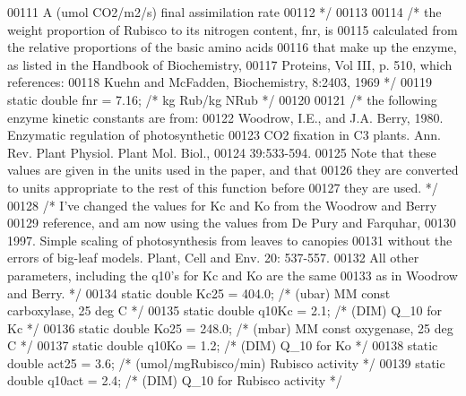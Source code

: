 \begin{DoxyCode}
00111 \textcolor{comment}{    A          (umol CO2/m2/s) final assimilation rate}
00112 \textcolor{comment}{    */}
00113     
00114     \textcolor{comment}{/* the weight proportion of Rubisco to its nitrogen content, fnr, is }
00115 \textcolor{comment}{    calculated from the relative proportions of the basic amino acids }
00116 \textcolor{comment}{    that make up the enzyme, as listed in the Handbook of Biochemistry, }
00117 \textcolor{comment}{    Proteins, Vol III, p. 510, which references:}
00118 \textcolor{comment}{    Kuehn and McFadden, Biochemistry, 8:2403, 1969 */}
00119     \textcolor{keyword}{static} \textcolor{keywordtype}{double} fnr = 7.16;   \textcolor{comment}{/* kg Rub/kg NRub */}
00120     
00121     \textcolor{comment}{/* the following enzyme kinetic constants are from: }
00122 \textcolor{comment}{    Woodrow, I.E., and J.A. Berry, 1980. Enzymatic regulation of photosynthetic}
00123 \textcolor{comment}{    CO2 fixation in C3 plants. Ann. Rev. Plant Physiol. Plant Mol. Biol.,}
00124 \textcolor{comment}{    39:533-594.}
00125 \textcolor{comment}{    Note that these values are given in the units used in the paper, and that}
00126 \textcolor{comment}{    they are converted to units appropriate to the rest of this function before}
00127 \textcolor{comment}{    they are used. */}
00128     \textcolor{comment}{/* I've changed the values for Kc and Ko from the Woodrow and Berry}
00129 \textcolor{comment}{    reference, and am now using the values from De Pury and Farquhar,}
00130 \textcolor{comment}{    1997. Simple scaling of photosynthesis from leaves to canopies}
00131 \textcolor{comment}{    without the errors of big-leaf models. Plant, Cell and Env. 20: 537-557. }
00132 \textcolor{comment}{    All other parameters, including the q10's for Kc and Ko are the same}
00133 \textcolor{comment}{    as in Woodrow and Berry. */}
00134     \textcolor{keyword}{static} \textcolor{keywordtype}{double} Kc25 = 404.0;   \textcolor{comment}{/* (ubar) MM const carboxylase, 25 deg C */} 
00135     \textcolor{keyword}{static} \textcolor{keywordtype}{double} q10Kc = 2.1;    \textcolor{comment}{/* (DIM) Q\_10 for Kc */}
00136     \textcolor{keyword}{static} \textcolor{keywordtype}{double} Ko25 = 248.0;   \textcolor{comment}{/* (mbar) MM const oxygenase, 25 deg C */}
00137     \textcolor{keyword}{static} \textcolor{keywordtype}{double} q10Ko = 1.2;    \textcolor{comment}{/* (DIM) Q\_10 for Ko */}
00138     \textcolor{keyword}{static} \textcolor{keywordtype}{double} act25 = 3.6;    \textcolor{comment}{/* (umol/mgRubisco/min) Rubisco activity */}
00139     \textcolor{keyword}{static} \textcolor{keywordtype}{double} q10act = 2.4;   \textcolor{comment}{/* (DIM) Q\_10 for Rubisco activity */}

\end{DoxyCode}
